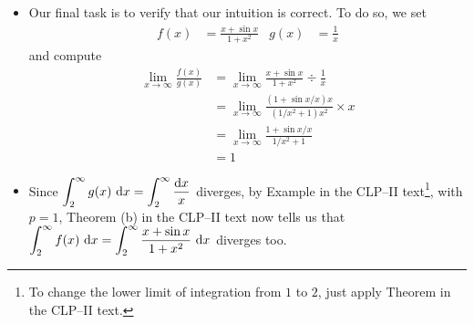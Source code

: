 \begin{solution}
\begin{description}
\begin{itemize}
\item Our final task is to verify that our intuition is correct. To do so, we
set
\begin{align*}
f(x) &= \frac{x+\sin x}{1+x^2} &
g(x) &= \frac{1}{x}
\end{align*}
and compute
\begin{align*}
\lim_{x\rightarrow\infty}\frac{f(x)}{g(x)}
&=\lim_{x\rightarrow\infty} \frac{x+\sin x}{1+x^2}\div\frac{1}{x} \\
&=\lim_{x\rightarrow\infty} \frac{(1+\sin x/x)x}{(1/x^2+1)x^2}\times x \\
&=\lim_{x\rightarrow\infty} \frac{1+\sin x/x}{1/x^2+1} \\
&=1
\end{align*}
\item Since $\displaystyle\int_2^\infty g(x)\ \dee{x} = \int_2^\infty\frac{\dee{x}}{x}$
diverges, by Example    in the
CLP--II text\footnote{To change the lower limit of integration from $1$
to $2$, just apply Theorem   in the
CLP--II text.},
with $p=1$,
Theorem  (b)  in the
CLP--II text
now tells us that $\displaystyle\int_2^\infty f(x)\ \mathrm{d}x
= \int_2^\infty\frac{x+\sin x}{1+x^2}\ \mathrm{d}x$  diverges too.

\end{itemize}




\end{description}
\end{solution}
